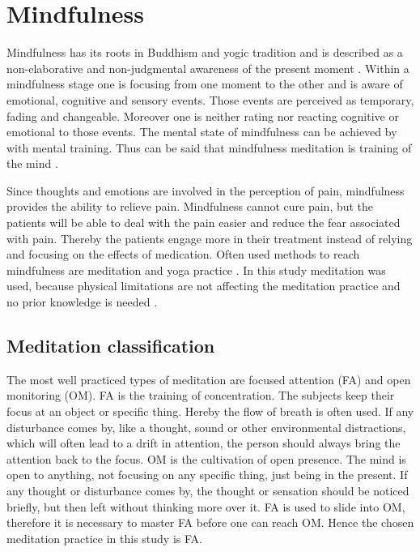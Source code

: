 \section{Mindfulness}
Mindfulness has its roots in Buddhism and yogic tradition and is described as a non-elaborative and non-judgmental awareness of the present moment \cite{Kabat1982,Zeidan2012,Zeidan2016,Tang2017}. Within a mindfulness stage one is focusing from one moment to the other and is aware of emotional, cognitive and sensory events. Those events are perceived as temporary, fading and changeable. Moreover one is neither rating nor reacting cognitive or emotional to those events. The mental state of mindfulness can be achieved by with mental training. \cite{Zeidan2012,Zeidan2016}  Thus can be said that mindfulness meditation is training of the mind \cite{Tang2017}. 

Since thoughts and emotions are involved in the perception of pain, mindfulness provides the ability to relieve pain. Mindfulness cannot cure pain, but the patients will be able to deal with the pain easier and reduce the fear associated with pain. Thereby the patients engage more in their treatment instead of relying and focusing on the effects of medication. \cite{Jacob2016}
Often used methods to reach mindfulness are meditation and yoga practice \cite{Kabat1982}.  In this study meditation was used, because physical limitations are not affecting the meditation practice and no prior knowledge is needed \cite{Tang2017}.


\subsection{Meditation classification}
The most well practiced types of meditation are focused attention (FA) and open monitoring (OM).\cite{Zeidan2016} FA is the training of concentration. The subjects keep their focus at an object or specific thing. Hereby the flow of breath is often used.  If any disturbance comes by, like a thought, sound or other environmental distractions, which will often lead to a drift in attention, the person should always bring the attention back to the focus. \cite{Zeidan2016} OM is the cultivation of open presence. The mind is open to anything, not focusing on any specific thing, just being in the present. If any thought or disturbance comes by, the thought or sensation should be noticed briefly, but then left without thinking more over it. FA is used to slide into OM, therefore it is necessary to master FA before one can reach OM. \cite{ Perlman2016, Zeidan2016,Kabat1982} Hence the chosen meditation practice in this study is FA.


